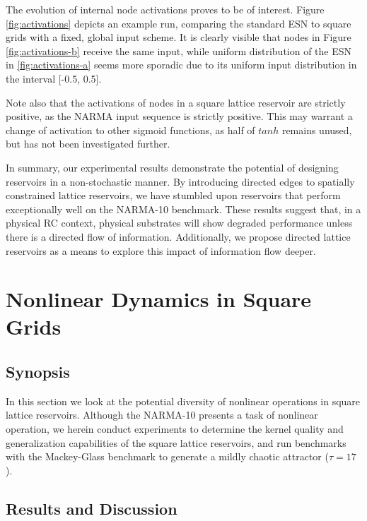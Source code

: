 The evolution of internal node activations proves to be of interest. Figure
\ref{fig:activations} depicts an example run, comparing the standard ESN to
square grids with a fixed, global input scheme. It is clearly visible that nodes
in Figure \ref{fig:activations-b} receive the same input, while uniform
distribution of the ESN in \ref{fig:activations-a} seems more sporadic due to
its uniform input distribution in the interval [-0.5, 0.5].

Note also that the activations of nodes in a square lattice reservoir are
strictly positive, as the NARMA input sequence is strictly positive. This may
warrant a change of activation to other sigmoid functions, as half of $tanh$
remains unused, but has not been investigated further.

In summary, our experimental results demonstrate the potential of designing
reservoirs in a non-stochastic manner. By introducing directed edges to
spatially constrained lattice reservoirs, we have stumbled upon reservoirs that
perform exceptionally well on the NARMA-10 benchmark. These results suggest
that, in a physical RC context, physical substrates will show degraded
performance unless there is a directed flow of information. Additionally, we
propose directed lattice reservoirs as a means to explore this impact of
information flow deeper.

\section{Nonlinear Dynamics in Square Grids}

\subsection{Synopsis}

In this section we look at the potential diversity of nonlinear operations in
square lattice reservoirs. Although the NARMA-10 presents a task of nonlinear
operation, we herein conduct experiments to determine the kernel quality and
generalization capabilities of the square lattice reservoirs, and run benchmarks
with the Mackey-Glass benchmark to generate a mildly chaotic attractor ($\tau =
17$).

\subsection{Results and Discussion}

